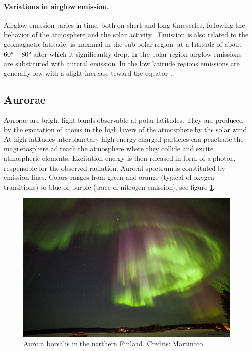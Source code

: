 \paragraph{Variations in airglow emission.} Airglow emission varies in time, both on short and long timescales, following the behavior of the atmosphere and the solar activity \cite{leinert19981997}. Emission is also related to the geomagnetic latitude: is maximal in the sub-polar region, at a latitude of about $\ang{60}-\ang{80}$ after which it significantly drop. In the polar region airglow emissions are substituted with auroral emission. In the low latitude regions emissions are generally low with a slight increase toward the equator \cite{eather1969latitudinal}.

\subsection{Aurorae}
Aurorae are bright light bands observable at polar latitudes. They are produced by the excitation of atoms in the high layers of the atmosphere by the solar wind. At high latitudes interplanetary high energy charged particles can penetrate the magnetosphere ad reach the atmosphere where they collide and excite atmospheric elements. Excitation energy is then released in form of a photon, responsible for the observed radiation. Auroral spectrum is constituted by emission lines. Colors ranges from green and orange (typical of oxygen transitions) to blue or purple (trace of nitrogen emission), see figure \ref{fig:aurora}.
\begin{figure}
	\centering
	\includegraphics[width=.8\textwidth]{./2_natural_sky/aurora}
	\caption{Aurora borealis in the northern Finland. Credits: \href{https://commons.wikimedia.org/wiki/File:Aurora_Borealis_-_polar_lights_3.jpg}{Martincco}.\label{fig:aurora}}
\end{figure}

